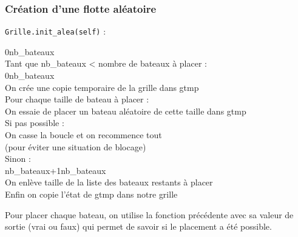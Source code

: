 \subsubsection{Création d'une flotte aléatoire}\label{init_alea}
\texttt{Grille.init\_alea(self)} :
\begin{algo1}
0\sto nb\_bateaux\\
Tant que nb\_bateaux < nombre de bateaux à placer :\\
0\sto nb\_bateaux\\
On crée une copie temporaire de la grille dans gtmp\\
Pour chaque taille de bateau à placer :\\
On essaie de placer un bateau aléatoire de cette taille dans gtmp\\
Si pas possible :\\
On casse la boucle et on recommence tout\\
(pour éviter une situation de blocage)\\
Sinon :\\
nb\_bateaux+1\sto nb\_bateaux\\
On enlève taille de la liste des bateaux restants à placer\\
Enfin on copie l'état de gtmp dans notre grille \\
\end{algo1}

Pour placer chaque bateau, on utilise la fonction précédente avec sa valeur de sortie (vrai ou faux) qui permet de savoir si le placement a été possible.


